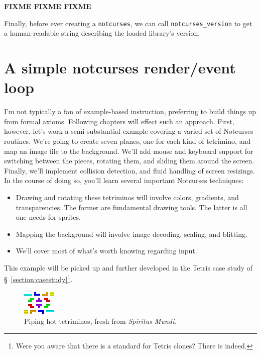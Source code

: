 \documentclass[letterpaper,10pt]{article}
\newenvironment{denseitemize}{
  \begin{itemize}
      \setlength{\itemsep}{0pt}
}{
  \end{itemize}
}
\begin{document}
\textbf{FIXME FIXME FIXME}

Finally, before ever creating a \texttt{notcurses}, we can call
\texttt{notcurses\_version} to get a human-readable string describing the
loaded library's version.

\newpage

\section{A simple notcurses render\slash event loop}
I'm not typically a fan of example-based instruction, preferring to build things
up from formal axioms. Following chapters will effect such an approach. First,
however, let's work a semi-substantial example covering a varied set of
Notcurses routines. We're going to create seven planes, one for each kind
of tetrimino, and map an image file to the background. We'll add mouse and
keyboard support for switching between the pieces, rotating them, and sliding
them around the screen. Finally, we'll implement collision detection, and
fluid handling of screen resizings. In the course of doing so, you'll learn
several important Notcurses techniques:

\begin{denseitemize}
\item{Drawing and rotating these tetriminos will involve colors, gradients, and
      transparencies. The former are fundamental drawing tools. The latter is
      all one needs for sprites.}
\item{Mapping the background will involve image decoding, scaling, and blitting.}
\item{We'll cover most of what's worth knowing regarding input.}
\end{denseitemize}

This example will be picked up and further developed in the Tetris case study
of §~\ref{section:casestudy}\footnote{Were you aware that there is a standard
for Tetris clones? There is indeed\cite{tetris}.}.

\begin{figure}[!htbp]
\centering \includegraphics[width=.5\linewidth]{media/tetriminos.png}
\caption{Piping hot tetriminos, fresh from \textit{Spiritus Mundi}.}
\label{fig:tetriminos}
\end{figure}
\end{document}
